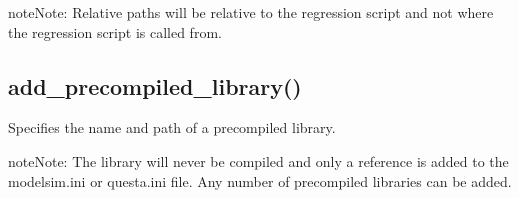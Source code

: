 \documentclass[letterpaper,10pt,english]{sphinxmanual}
\begin{document}
\begin{sphinxadmonition}{note}{Note:}
\sphinxAtStartPar
Relative paths will be relative to the regression script
and not where the regression script is called from.
\end{sphinxadmonition}


\subsection{add\_precompiled\_library()}
\label{\detokenize{api:add-precompiled-library}}
\sphinxAtStartPar
Specifies the name and path of a precompiled library.

\begin{sphinxadmonition}{note}{Note:}
\sphinxAtStartPar
The library will never be compiled and only a reference is added to the modelsim.ini or questa.ini file.
Any number of precompiled libraries can be added.
\end{sphinxadmonition}

\begin{sphinxVerbatim}[commandchars=\\\{\}]
 
\end{sphinxVerbatim}
\end{document}
